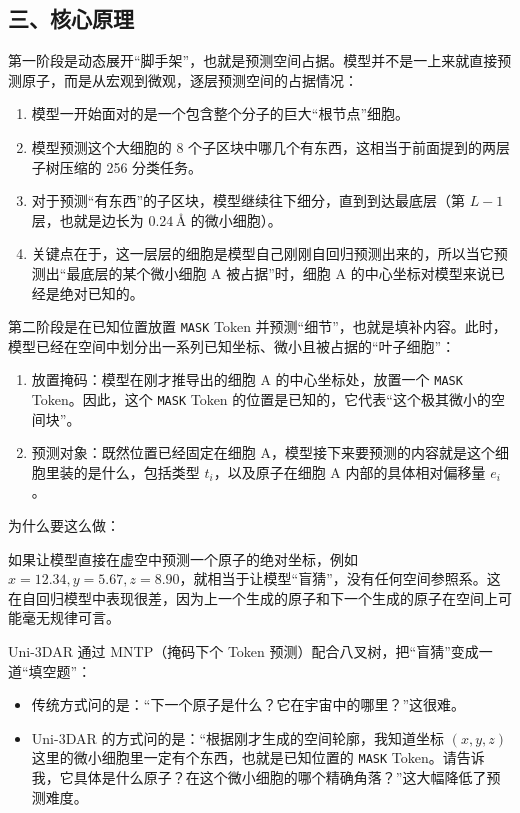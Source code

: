 \hypertarget{ux4e09ux6838ux5fc3ux539fux7406}{%
\subsection{三、核心原理}\label{ux4e09ux6838ux5fc3ux539fux7406}}

第一阶段是动态展开``脚手架''，也就是预测空间占据。模型并不是一上来就直接预测原子，而是从宏观到微观，逐层预测空间的占据情况：

\begin{enumerate}
\def\labelenumi{\arabic{enumi}.}
\tightlist
\item
  模型一开始面对的是一个包含整个分子的巨大``根节点''细胞。
\item
  模型预测这个大细胞的 8 个子区块中哪几个有东西，这相当于前面提到的两层子树压缩的 256 分类任务。
\item
  对于预测``有东西''的子区块，模型继续往下细分，直到到达最底层（第 \(L-1\) 层，也就是边长为 \(0.24\,\text{\AA}\) 的微小细胞）。
\item
  关键点在于，这一层层的细胞是模型自己刚刚自回归预测出来的，所以当它预测出``最底层的某个微小细胞 A 被占据''时，细胞 A 的中心坐标对模型来说已经是绝对已知的。
\end{enumerate}

第二阶段是在已知位置放置 \texttt{MASK} Token 并预测``细节''，也就是填补内容。此时，模型已经在空间中划分出一系列已知坐标、微小且被占据的``叶子细胞''：

\begin{enumerate}
\def\labelenumi{\arabic{enumi}.}
\tightlist
\item
  放置掩码：模型在刚才推导出的细胞 A 的中心坐标处，放置一个 \texttt{MASK} Token。因此，这个 \texttt{MASK} Token 的位置是已知的，它代表``这个极其微小的空间块''。
\item
  预测对象：既然位置已经固定在细胞 A，模型接下来要预测的内容就是这个细胞里装的是什么，包括类型 \(t_i\)，以及原子在细胞 A 内部的具体相对偏移量 \(e_i\)。
\end{enumerate}

为什么要这么做：

如果让模型直接在虚空中预测一个原子的绝对坐标，例如 \(x = 12.34, y = 5.67, z = 8.90\)，就相当于让模型``盲猜''，没有任何空间参照系。这在自回归模型中表现很差，因为上一个生成的原子和下一个生成的原子在空间上可能毫无规律可言。

Uni-3DAR 通过 MNTP（掩码下个 Token 预测）配合八叉树，把``盲猜''变成一道``填空题''：

\begin{itemize}
\tightlist
\item
  传统方式问的是：``下一个原子是什么？它在宇宙中的哪里？''这很难。
\item
  Uni-3DAR 的方式问的是：``根据刚才生成的空间轮廓，我知道坐标 \((x,y,z)\) 这里的微小细胞里一定有个东西，也就是已知位置的 \texttt{MASK} Token。请告诉我，它具体是什么原子？在这个微小细胞的哪个精确角落？''这大幅降低了预测难度。
\end{itemize}

